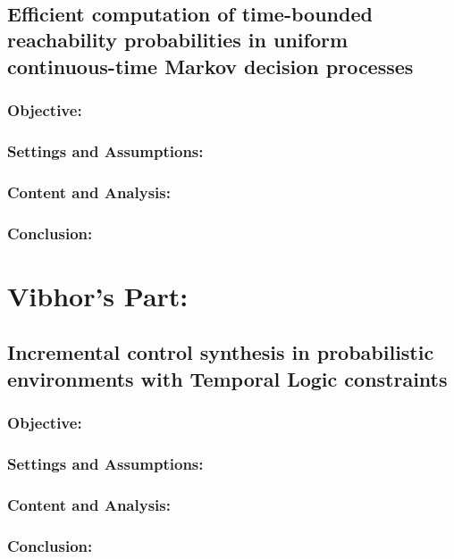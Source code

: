 \documentclass{article}
\theoremstyle{definition}
\begin{document}
\\
\subsection{Efficient
computation of time-bounded reachability probabilities in uniform
continuous-time Markov decision processes}
\subsubsection{Objective:}

\subsubsection{Settings and Assumptions:}

\subsubsection{Content and Analysis:}

\subsubsection{Conclusion:}


\section{Vibhor's Part:}
\subsection{ Incremental control synthesis in probabilistic environments with Temporal Logic constraints}
\subsubsection{Objective:}

\subsubsection{Settings and Assumptions:}

\subsubsection{Content and Analysis:}

\subsubsection{Conclusion:}
\end{document}
